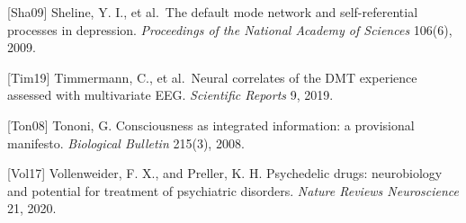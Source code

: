 \documentclass[12pt]{article}
\begin{document}
{[}Sha09{]} Sheline, Y. I., et al.~The default mode network and
self-referential processes in depression. \emph{Proceedings of the
National Academy of Sciences} 106(6), 2009.

{[}Tim19{]} Timmermann, C., et al.~Neural correlates of the DMT
experience assessed with multivariate EEG. \emph{Scientific Reports} 9,
2019.

{[}Ton08{]} Tononi, G. Consciousness as integrated information: a
provisional manifesto. \emph{Biological Bulletin} 215(3), 2008.

{[}Vol17{]} Vollenweider, F. X., and Preller, K. H. Psychedelic drugs:
neurobiology and potential for treatment of psychiatric disorders.
\emph{Nature Reviews Neuroscience} 21, 2020.
\end{document}
